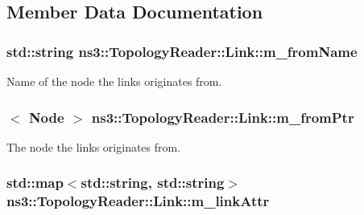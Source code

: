 \subsection{Member Data Documentation}
\subsubsection[{\texorpdfstring{m\+\_\+from\+Name}{m_fromName}}]{\setlength{\rightskip}{0pt plus 5cm}std\+::string ns3\+::\+Topology\+Reader\+::\+Link\+::m\+\_\+from\+Name\hspace{0.3cm}{\ttfamily [private]}}\hypertarget{classns3_1_1TopologyReader_1_1Link_a9c317022c868f9aac4bb7bbd7fdca083}{}\label{classns3_1_1TopologyReader_1_1Link_a9c317022c868f9aac4bb7bbd7fdca083}


Name of the node the links originates from. 

\subsubsection[{\texorpdfstring{m\+\_\+from\+Ptr}{m_fromPtr}}]{$<$ {\bf Node} $>$ ns3\+::\+Topology\+Reader\+::\+Link\+::m\+\_\+from\+Ptr\hspace{0.3cm}{\ttfamily [private]}}\hypertarget{classns3_1_1TopologyReader_1_1Link_a2c5203e648f0685f196c8c6b3fd4091e}{}\label{classns3_1_1TopologyReader_1_1Link_a2c5203e648f0685f196c8c6b3fd4091e}


The node the links originates from. 

\subsubsection[{\texorpdfstring{m\+\_\+link\+Attr}{m_linkAttr}}]{\setlength{\rightskip}{0pt plus 5cm}std\+::map$<$std\+::string, std\+::string$>$ ns3\+::\+Topology\+Reader\+::\+Link\+::m\+\_\+link\+Attr\hspace{0.3cm}{\ttfamily [private]}}\hypertarget{classns3_1_1TopologyReader_1_1Link_a2b325284263ae796ac5d307f6e449e47}{}\label{classns3_1_1TopologyReader_1_1Link_a2b325284263ae796ac5d307f6e449e47}


